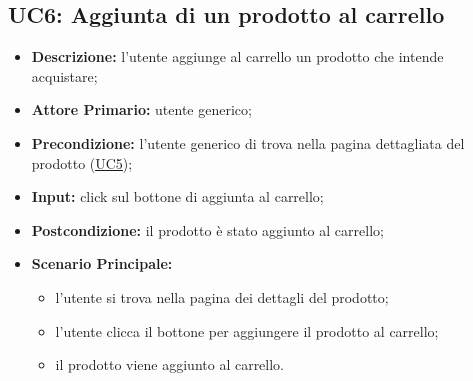 \subsection{UC6: Aggiunta di un prodotto al carrello}
\label{sec:UC6}
\begin{itemize}
    \item \textbf{Descrizione:} l'utente aggiunge al carrello un prodotto che intende acquistare;
    \item \textbf{Attore Primario:} utente generico;
    \item \textbf{Precondizione:} l'utente generico di trova nella pagina dettagliata del prodotto (\hyperref[sec:UC5]{\underline{UC5}});
    \item \textbf{Input:} click sul bottone di aggiunta al carrello;
    \item \textbf{Postcondizione:} il prodotto è stato aggiunto al carrello;
    \item \textbf{Scenario Principale:}
          \begin{itemize}
              \item l'utente si trova nella pagina dei dettagli del prodotto;
              \item l'utente clicca il bottone per aggiungere il prodotto al carrello;
              \item il prodotto viene aggiunto al carrello.
          \end{itemize}
\end{itemize}